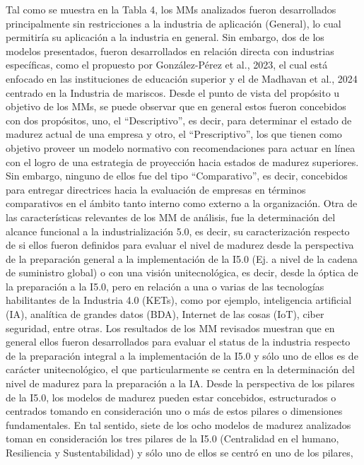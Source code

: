 \documentclass{article}
\begin{document}
Tal como se muestra en la Tabla 4, los MMs analizados fueron
desarrollados principalmente sin restricciones a la industria de
aplicación (General), lo cual permitiría su aplicación a la industria en
general. Sin embargo, dos de los modelos presentados, fueron
desarrollados en relación directa con industrias específicas, como el
propuesto por González-Pérez et al., 2023, el cual está enfocado en las
instituciones de educación superior y el de Madhavan et al., 2024
centrado en la Industria de mariscos. Desde el punto de vista del
propósito u objetivo de los MMs, se puede observar que en general estos
fueron concebidos con dos propósitos, uno, el ``Descriptivo'', es decir,
para determinar el estado de madurez actual de una empresa y otro, el
``Prescriptivo'', los que tienen como objetivo proveer un modelo
normativo con recomendaciones para actuar en línea con el logro de una
estrategia de proyección hacia estados de madurez superiores. Sin
embargo, ninguno de ellos fue del tipo ``Comparativo'', es decir,
concebidos para entregar directrices hacia la evaluación de empresas en
términos comparativos en el ámbito tanto interno como externo a la
organización. Otra de las características relevantes de los MM de
análisis, fue la determinación del alcance funcional a la
industrialización 5.0, es decir, su caracterización respecto de si ellos
fueron definidos para evaluar el nivel de madurez desde la perspectiva
de la preparación general a la implementación de la I5.0 (Ej. a nivel de
la cadena de suministro global) o con una visión unitecnológica, es
decir, desde la óptica de la preparación a la I5.0, pero en relación a
una o varias de las tecnologías habilitantes de la Industria 4.0 (KETs),
como por ejemplo, inteligencia artificial (IA), analítica de grandes
datos (BDA), Internet de las cosas (IoT), ciber seguridad, entre otras.
Los resultados de los MM revisados muestran que en general ellos fueron
desarrollados para evaluar el status de la industria respecto de la
preparación integral a la implementación de la I5.0 y sólo uno de ellos
es de carácter unitecnológico, el que particularmente se centra en la
determinación del nivel de madurez para la preparación a la IA. Desde la
perspectiva de los pilares de la I5.0, los modelos de madurez pueden
estar concebidos, estructurados o centrados tomando en consideración uno
o más de estos pilares o dimensiones fundamentales. En tal sentido,
siete de los ocho modelos de madurez analizados toman en consideración
los tres pilares de la I5.0 (Centralidad en el humano, Resiliencia y
Sustentabilidad) y sólo uno de ellos se centró en uno de los pilares,
\end{document}
